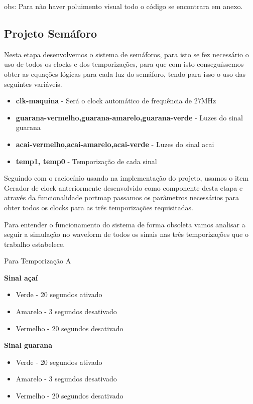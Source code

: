 obs: Para não haver poluimento visual todo o código se encontrara em anexo.

\subsection{Projeto Semáforo}

\setlength{\parindent}{2cm}

Nesta etapa desenvolvemos o sistema de semáforos, para isto se fez necessário o uso de todos os clocks e dos temporizações, para que com isto conseguíssemos obter as equações lógicas para cada luz do semáforo, tendo para isso o uso das seguintes variáveis.\newline

\begin{itemize}
\item  \textbf{clk-maquina} - Será o clock automático de frequência de 27MHz 
\item \textbf{guarana-vermelho,guarana-amarelo,guarana-verde} - Luzes do sinal guarana
\item \textbf{acai-vermelho,acai-amarelo,acai-verde} - Luzes do sinal acai
\item \textbf{temp1, temp0}  - Temporização de cada sinal \newline
\end{itemize}

\setlength{\parindent}{2cm}
Seguindo com o raciocínio usando na implementação do projeto, usamos o item Gerador de clock anteriormente desenvolvido como componente desta etapa e através da funcionalidade portmap passamos os parâmetros necessários para obter todos os clocks para as três temporizações requisitadas.

Para entender o funcionamento do sistema de forma obsoleta vamos analisar a seguir a simulação no waveform de todos os sinais nas três temporizações que o trabalho estabelece.\newline

Para Temporização A\newline 
\begin{itemize}
\end{itemize}
		\textbf{Sinal açaí}
\begin{itemize}
\item Verde - 20 segundos ativado
\item Amarelo - 3 segundos desativado
\item Vermelho - 20 segundos desativado\newline
\end{itemize}
	\textbf{Sinal guarana }
\begin{itemize}
\item Verde - 20 segundos ativado
\item Amarelo - 3 segundos desativado
\item Vermelho - 20 segundos desativado 
\end{itemize}

